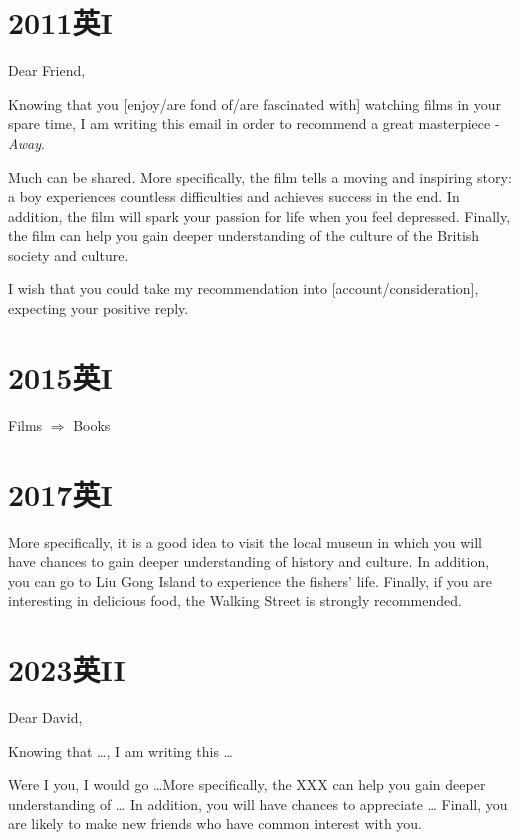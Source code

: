 \section{2011英I}

\noindent Dear Friend,

Knowing that you [enjoy/are fond of/are fascinated with] watching films in your spare time,
I am writing this email in order to recommend a great masterpiece - \textit{Away}. 

Much can be shared. More specifically, the film tells a moving and inspiring story: a boy
experiences countless difficulties and achieves success in the end.
In addition, the film will spark your passion for life when you feel depressed. 
Finally, the film can help you gain deeper understanding of the culture of 
the British society and culture. 

I wish that you could take my recommendation into [account/consideration], expecting your positive reply.

\YSLM

\section{2015英I}

\noindent Films $ \Rightarrow $ Books

\section{2017英I}

More specifically, it is a good idea to visit the local museun in which you will 
have chances to gain deeper understanding of history and culture. 
In addition, you can go to Liu Gong Island to experience the fishers' life.
Finally, if you are interesting in delicious food, the Walking Street is strongly recommended.

\newpage

\section{2023英II}

\noindent Dear David,

Knowing that \dots, I am writing this \dots

Were I you, I would go \dots More specifically,
the XXX can help you gain deeper understanding of \dots
In addition, you will have chances to appreciate \dots
Finall, you are likely to make new friends who have common interest with you.

